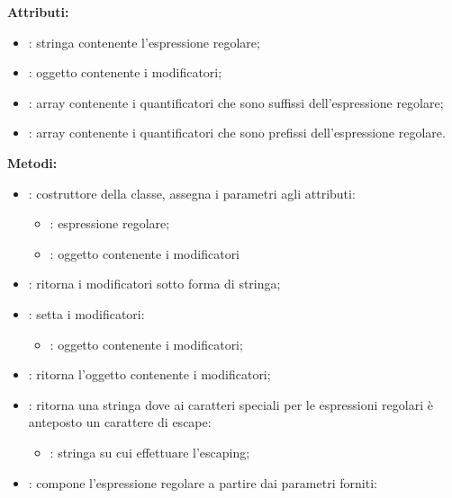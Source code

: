 %
\textbf{Attributi:}
\begin{itemize}
	\item {}: stringa contenente l'espressione regolare;
	\item {}: oggetto contenente i modificatori;
	\item {}: array contenente i quantificatori che sono suffissi dell'espressione regolare;
	\item {}: array contenente i quantificatori che sono prefissi dell'espressione regolare.
\end{itemize}

\textbf{Metodi:}
\begin{itemize}
	\item {}: costruttore della classe, assegna i parametri agli attributi:
	\begin{itemize}
		\item {}: espressione regolare;
		\item {}: oggetto contenente i modificatori
	\end{itemize}
	\item {}: ritorna i modificatori sotto forma di stringa;
	\item {}: setta i modificatori:
	\begin{itemize}
		\item {}: oggetto contenente i modificatori;
	\end{itemize}
	\item {}: ritorna l'oggetto contenente i modificatori;
	\item {}: ritorna una stringa dove ai caratteri speciali per le espressioni regolari è anteposto un carattere di escape:
	\begin{itemize}
		\item {}: stringa su cui effettuare l'escaping;
	\end{itemize}
	\item {}: compone l'espressione regolare a partire dai parametri forniti:
	\begin{itemize}

\end{itemize}
\end{itemize}

